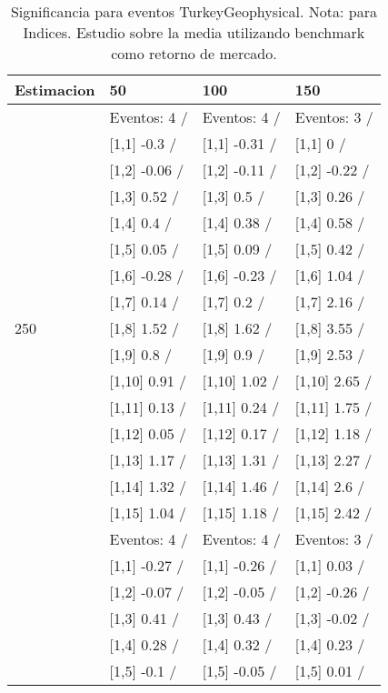 \begin{table}

\caption{Significancia para eventos TurkeyGeophysical. Nota: para Indices. Estudio sobre la media utilizando benchmark como retorno de mercado.}
\centering
\begin{tabular}[t]{llll}
\toprule
Estimacion & 50 & 100 & 150\\
\midrule
 & Eventos:  4 / & Eventos:  4 / & Eventos:  3 /\\
 & {}[1,1] -0.3  / & {}[1,1] -0.31  / & {}[1,1] 0  /\\
 & {}[1,2] -0.06  / & {}[1,2] -0.11  / & {}[1,2] -0.22  /\\
 & {}[1,3] 0.52  / & {}[1,3] 0.5  / & {}[1,3] 0.26  /\\
 & {}[1,4] 0.4  / & {}[1,4] 0.38  / & {}[1,4] 0.58  /\\
\addlinespace
 & {}[1,5] 0.05  / & {}[1,5] 0.09  / & {}[1,5] 0.42  /\\
 & {}[1,6] -0.28  / & {}[1,6] -0.23  / & {}[1,6] 1.04  /\\
 & {}[1,7] 0.14  / & {}[1,7] 0.2  / & {}[1,7] 2.16  /\\
250 & {}[1,8] 1.52  / & {}[1,8] 1.62  / & {}[1,8] 3.55  /\\
 & {}[1,9] 0.8  / & {}[1,9] 0.9  / & {}[1,9] 2.53  /\\
\addlinespace
 & {}[1,10] 0.91  / & {}[1,10] 1.02  / & {}[1,10] 2.65  /\\
 & {}[1,11] 0.13  / & {}[1,11] 0.24  / & {}[1,11] 1.75  /\\
 & {}[1,12] 0.05  / & {}[1,12] 0.17  / & {}[1,12] 1.18  /\\
 & {}[1,13] 1.17  / & {}[1,13] 1.31  / & {}[1,13] 2.27  /\\
 & {}[1,14] 1.32  / & {}[1,14] 1.46  / & {}[1,14] 2.6  /\\
\addlinespace
 & {}[1,15] 1.04  / & {}[1,15] 1.18  / & {}[1,15] 2.42  /\\
 & Eventos:  4 / & Eventos:  4 / & Eventos:  3 /\\
 & {}[1,1] -0.27  / & {}[1,1] -0.26  / & {}[1,1] 0.03  /\\
 & {}[1,2] -0.07  / & {}[1,2] -0.05  / & {}[1,2] -0.26  /\\
 & {}[1,3] 0.41  / & {}[1,3] 0.43  / & {}[1,3] -0.02  /\\
\addlinespace
 & {}[1,4] 0.28  / & {}[1,4] 0.32  / & {}[1,4] 0.23  /\\
 & {}[1,5] -0.1  / & {}[1,5] -0.05  / & {}[1,5] 0.01  /\\

\end{tabular}
\end{table}
